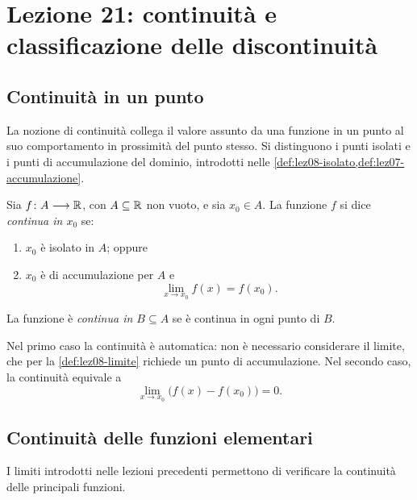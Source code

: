 \chapter[Lezione 21 --- 19 novembre 2026]{Lezione 21: continuità e classificazione delle discontinuità}
\label{chap:lezione-21}

\section{Continuità in un punto}
\label{sec:lez21-continuita}

La nozione di continuità collega il valore assunto da una
funzione in un punto al suo comportamento in prossimità
del punto stesso. Si distinguono i punti isolati e i punti
di accumulazione del dominio, introdotti nelle
\cref{def:lez08-isolato,def:lez07-accumulazione}.

\begin{definition}
\label{def:lez21-continuita}
Sia \(f\colon A\longrightarrow\mathbb{R}\), con \(A\subseteq\mathbb{R}\)
non vuoto, e sia \(x_0\in A\). La funzione \(f\) si dice
\emph{continua in \(x_0\)} se:
\begin{enumerate}
  \item \(x_0\) è isolato in \(A\); oppure
  \item \(x_0\) è di accumulazione per \(A\) e
  \[
    \lim_{x\to x_0}f(x)=f(x_0).
  \]
\end{enumerate}
La funzione è \emph{continua in \(B\subseteq A\)} se è
continua in ogni punto di \(B\).
\end{definition}

Nel primo caso la continuità è automatica: non è
necessario considerare il limite, che per la
\cref{def:lez08-limite} richiede un punto di accumulazione.
Nel secondo caso, la continuità equivale a
\[
  \lim_{x\to x_0}\bigl(f(x)-f(x_0)\bigr)=0.
\]

\section{Continuità delle funzioni elementari}
\label{sec:lez21-funzioni-elementari}

I limiti introdotti nelle lezioni precedenti permettono di
verificare la continuità delle principali funzioni.

